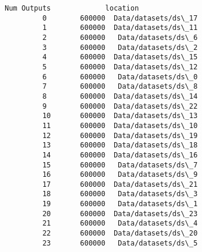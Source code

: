 \documentclass[11pt]{article}
\begin{document}
\begin{Verbatim}[commandchars=\\\{\}]
             Num Outputs             location  
         0        600000  Data/datasets/ds\_17  
         1        600000  Data/datasets/ds\_11  
         2        600000   Data/datasets/ds\_6  
         3        600000   Data/datasets/ds\_2  
         4        600000  Data/datasets/ds\_15  
         5        600000  Data/datasets/ds\_12  
         6        600000   Data/datasets/ds\_0  
         7        600000   Data/datasets/ds\_8  
         8        600000  Data/datasets/ds\_14  
         9        600000  Data/datasets/ds\_22  
         10       600000  Data/datasets/ds\_13  
         11       600000  Data/datasets/ds\_10  
         12       600000  Data/datasets/ds\_19  
         13       600000  Data/datasets/ds\_18  
         14       600000  Data/datasets/ds\_16  
         15       600000   Data/datasets/ds\_7  
         16       600000   Data/datasets/ds\_9  
         17       600000  Data/datasets/ds\_21  
         18       600000   Data/datasets/ds\_3  
         19       600000   Data/datasets/ds\_1  
         20       600000  Data/datasets/ds\_23  
         21       600000   Data/datasets/ds\_4  
         22       600000  Data/datasets/ds\_20  
         23       600000   Data/datasets/ds\_5  
\end{Verbatim}
            

    
    
    
    
\end{document}
